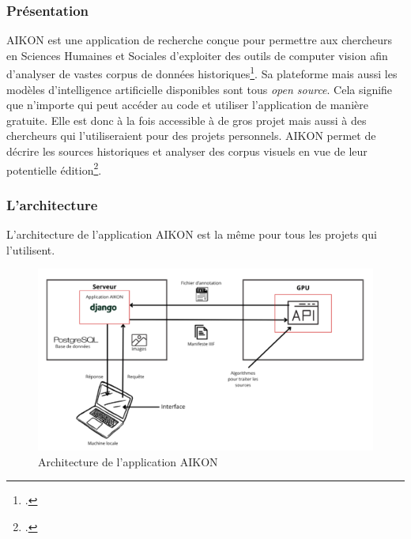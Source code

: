 \subsubsection{Présentation}
AIKON est une application de recherche conçue pour permettre aux chercheurs en Sciences Humaines et Sociales  d'exploiter des outils de computer vision afin d'analyser de vastes corpus de données historiques\footcite{aikonAikonplatformAikon2025}. 
Sa  plateforme mais aussi les modèles d'intelligence artificielle disponibles sont tous \textit{open source}. Cela signifie que n'importe qui peut accéder au code et utiliser l'application de manière gratuite. Elle est donc à la fois accessible à de gros projet mais aussi à des chercheurs qui l'utiliseraient pour des projets personnels. 
AIKON permet de décrire les sources historiques et analyser des corpus visuels en vue de leur potentielle édition\footcite{albouyAIKONComputerVision}.

\subsubsection{L'architecture}

L'architecture de l'application AIKON est la même pour tous les projets qui l'utilisent.

\begin{figure}[H]
	\centering
	\includegraphics[width=1\textwidth]{images/architecture_aikon.png}
	\caption{Architecture de l'application AIKON}
	\label{fig:architecture_aikon}
\end{figure}


